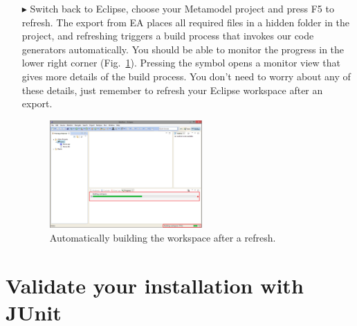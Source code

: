 \begin{enumerate}
\item[$\blacktriangleright$] Switch back to Eclipse, choose your Metamodel project and press F5 to refresh.
The export from EA places all required files in a hidden folder in the project, and refreshing triggers a build process that invokes our code generators automatically.
You should be able to monitor the progress in the lower right corner (Fig.~\ref{fig_eclipsebuilding}).  
Pressing the symbol opens a monitor view that gives more details of the build process. 
You don't need to worry about any of these details, just remember to refresh your Eclipse workspace after an export.
\begin{figure}[htbp]
	\centering
  \includegraphics[width=0.55\textwidth]{../installation_images/eclipse_building.png}
	\caption{Automatically building the workspace after a refresh.}
	\label{fig_eclipsebuilding}
\end{figure}
\end{enumerate}

\section{Validate your installation with JUnit}
\label{sec:junit}

